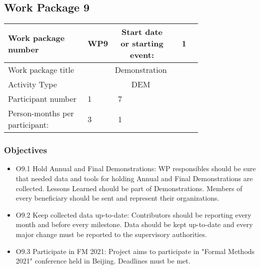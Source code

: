 \subsection{Work Package 9}

\begin{table}[hbpt]\centering
	\begin{tabular}{|p{0.35\linewidth}|p{0.06\linewidth}|p{0.06\linewidth}|p{0.06\linewidth}|
         p{0.06\linewidth}|p{0.06\linewidth}|p{0.06\linewidth}|p{0.06\linewidth}|}\hline
		 Work package number& WP9 &
		 \multicolumn{4}{|c|}{Start date or starting event:}{}&
		 \multicolumn{2}{|c|}{                        1 }{}\\\hline
		 Work package title&\multicolumn{7}{|c|}{ Demonstration }{}\\\hline
		 Activity Type&\multicolumn{7}{|c|}{      DEM }{}\\\hline
		 Participant number & 1 & 7 & ~ & ~ & ~ & ~ & ~ \\\hline
		 Person-months per participant: & 3 & 1 & ~ & ~ & ~ & ~ & ~ \\\hline
	\end{tabular}
\end{table}

\subsubsection{Objectives}
\begin{itemize}
	\item O9.1 Hold Annual and Final Demonstrations: WP responsibles  should be sure that needed data and tools for holding Annual and Final Demonstrations are collected. Lessons Learned should be part of Demonstrations. Members of every beneficiary should be sent and represent their organizations. 
	
	\item O9.2 Keep collected data up-to-date: Contributors should be reporting every month and before every milestone. Data should be kept up-to-date and every major change must be reported to the supervisory authorities.
	
	\item O9.3 Participate in FM 2021: Project aims to participate in "Formal Methods 2021" conference held in Beijing. Deadlines must be met.
\end{itemize}

